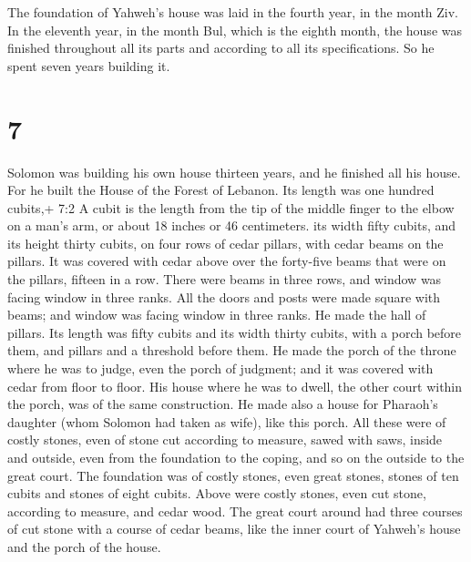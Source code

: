  The foundation of Yahweh's house was laid in the fourth
year, in the month Ziv.  In the eleventh year, in the month
Bul, which is the eighth month, the house was finished throughout all
its parts and according to all its specifications. So he spent seven
years building it.

\hypertarget{section-6}{%
\section{7}\label{section-6}}

 Solomon was building his own house thirteen years, and he
finished all his house.  For he built the House of the
Forest of Lebanon. Its length was one hundred cubits,+ 7:2 A cubit is
the length from the tip of the middle finger to the elbow on a man's
arm, or about 18 inches or 46 centimeters. its width fifty cubits, and
its height thirty cubits, on four rows of cedar pillars, with cedar
beams on the pillars.  It was covered with cedar above over
the forty-five beams that were on the pillars, fifteen in a row.
 There were beams in three rows, and window was facing
window in three ranks.  All the doors and posts were made
square with beams; and window was facing window in three ranks.
 He made the hall of pillars. Its length was fifty cubits
and its width thirty cubits, with a porch before them, and pillars and a
threshold before them.  He made the porch of the throne
where he was to judge, even the porch of judgment; and it was covered
with cedar from floor to floor.  His house where he was to
dwell, the other court within the porch, was of the same construction.
He made also a house for Pharaoh's daughter (whom Solomon had taken as
wife), like this porch.  All these were of costly stones,
even of stone cut according to measure, sawed with saws, inside and
outside, even from the foundation to the coping, and so on the outside
to the great court.  The foundation was of costly stones,
even great stones, stones of ten cubits and stones of eight cubits.
 Above were costly stones, even cut stone, according to
measure, and cedar wood.  The great court around had three
courses of cut stone with a course of cedar beams, like the inner court
of Yahweh's house and the porch of the house.

